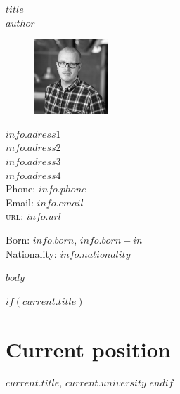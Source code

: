 \documentclass[11pt, a4paper]{article} %
\begin{document}

{\LARGE \em{$title$}}\\[0.5cm] %
{\LARGE $author$}\\[1cm] %

\begin{figure}
  \vspace{-16pt}
  \includegraphics[width=0.25\textwidth]{assets/profile_pic.png}
\end{figure}

$info.adress1$\\ %
$info.adress2$\\ %
$info.adress3$\\ %
$info.adress4$\\ %
[.2cm]
Phone: \texttt{$info.phone$}\\ %
Email: \href{mailto:#}{$info.email$}\\ %
\textsc{url}: \href{http://$info.url$}{$info.url$}\\ %


\vspace{40pt}


Born: $info.born$, $info.born-in$\\ %
Nationality: $info.nationality$ %


$body$

\vspace{20pt}


$if(current.title)$
\section*{Current position}

\emph{$current.title$}, $current.university$ %
$endif$
\end{document}
